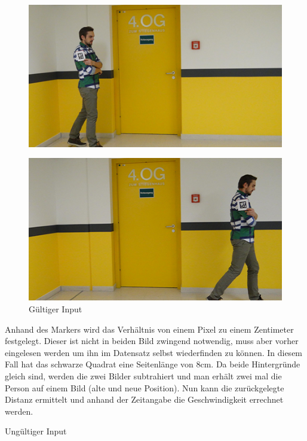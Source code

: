 \documentclass[deutsch]{scrartcl}
\begin{document}
\begin{figure}[ht]
	\centering
	\includegraphics{testimg1.png}
	\label{fig1}
\end{figure}
\begin{figure}[ht]
	\centering
	\includegraphics{testimg2.png}
	\caption{Gültiger Input}
	\label{fig2}
\end{figure}
Anhand des Markers wird das Verhältnis von einem Pixel zu einem Zentimeter festgelegt.
Dieser ist nicht in beiden Bild zwingend notwendig, muss aber vorher eingelesen werden um ihn im Datensatz selbst wiederfinden zu können. In diesem Fall hat das schwarze Quadrat eine Seitenlänge von 8cm.
Da beide Hintergründe gleich sind, werden die zwei Bilder subtrahiert und man erhält zwei mal die Person auf einem Bild (alte und neue Position). Nun kann die zurückgelegte Distanz ermittelt und anhand der Zeitangabe die Geschwindigkeit errechnet werden.

Ungültiger Input
\end{document}
